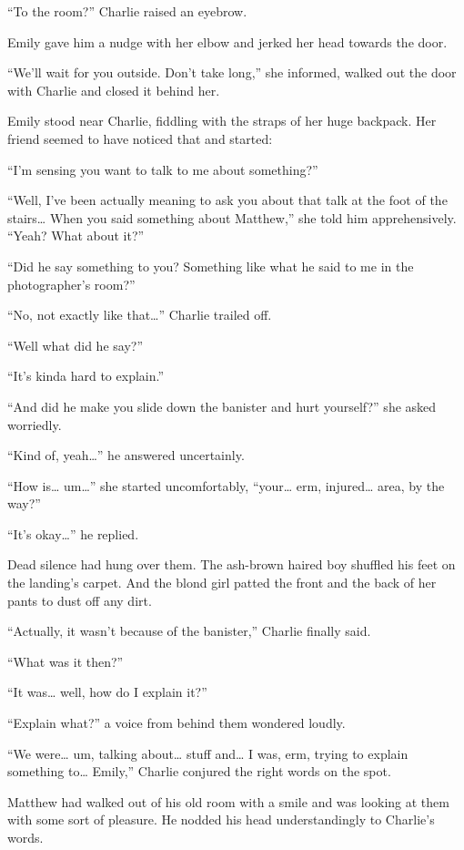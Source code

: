 “To the room?” Charlie raised an eyebrow.

Emily gave him a nudge with her elbow and jerked her head towards the door.

“We'll wait for you outside. Don't take long,” she informed, walked out the door with Charlie and closed it behind her.

\bigskip

Emily stood near Charlie, fiddling with the straps of her huge backpack. Her friend seemed to have noticed that and started:

“I'm sensing you want to talk to me about something?”

“Well, I've been actually meaning to ask you about that talk at the foot of the stairs… When you said something about Matthew,” she told him apprehensively.
“Yeah? What about it?”

“Did he say something to you? Something like what he said to me in the photographer's room?”

“No, not exactly like that…” Charlie trailed off.

“Well what did he say?”

“It's kinda hard to explain.”

“And did he make you slide down the banister and hurt yourself?” she asked worriedly.

“Kind of, yeah…” he answered uncertainly.

“How is… um…” she started uncomfortably, “your… erm, injured… area, by the way?”

“It's okay…” he replied.

Dead silence had hung over them. The ash-brown haired boy shuffled his feet on the landing's carpet. And the blond girl patted the front and the back of her pants to dust off any dirt.

“Actually, it wasn't because of the banister,” Charlie finally said.

“What was it then?”

“It was… well, how do I explain it?”

“Explain what?” a voice from behind them wondered loudly.

“We were… um, talking about… stuff and… I was, erm, trying to explain something to… Emily,” Charlie conjured the right words on the spot.

Matthew had walked out of his old room with a smile and was looking at them with some sort of pleasure. He nodded his head understandingly to Charlie's words.

